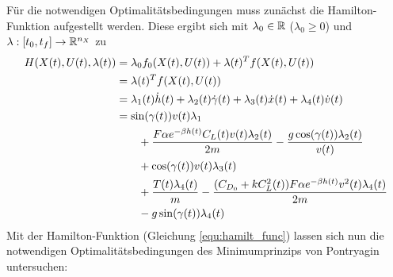 Für die notwendigen Optimalitätsbedingungen muss zunächst die Hamilton-Funktion aufgestellt werden. Diese ergibt sich mit $\lambda_0 \in \mathbb{R}$ ($\lambda_0 \geq 0$) und $\lambda : [t_0,t_f] \to \mathbb{R}^{n_X}$ zu
\begin{equation} \label{equ:hamilt_func}
    \begin{split}
        H(X(t),U(t),\lambda(t)) &= \lambda_0 f_0(X(t),U(t)) + \lambda(t)^T f(X(t),U(t)) \\\
        &= \lambda(t)^T f(X(t),U(t)) \\\
        &= \lambda_1(t) \dot{h}(t) + \lambda_2(t) \dot{\gamma}(t) + \lambda_3(t) \dot{x}(t) + \lambda_4(t) \dot{v}(t) \\\
        &= \sin(\gamma(t)) v(t) \lambda_1 \\\
        &\hspace{7mm} + \dfrac{F \alpha e^{-\beta h(t)} C_L(t) v(t) \lambda_2(t)}{2m} - \dfrac{g \cos(\gamma(t)) \lambda_2(t)}{v(t)} \\\
        &\hspace{7mm} + \cos(\gamma(t)) v(t) \lambda_3(t) \\\
        &\hspace{7mm} + \dfrac{T(t) \lambda_4(t)}{m} - \dfrac{(C_{D_0} + k C_L^2(t)) F \alpha e^{-\beta h(t)} v^2(t) \lambda_4(t)}{2m} \\\
        &\hspace{7mm} - g \sin(\gamma(t)) \lambda_4(t)
    \end{split}
\end{equation}
Mit der Hamilton-Funktion (Gleichung \eqref{equ:hamilt_func}) lassen sich nun die notwendigen Optimalitätsbedingungen des Minimumprinzips von Pontryagin \cite{OptiControl2018} untersuchen:

